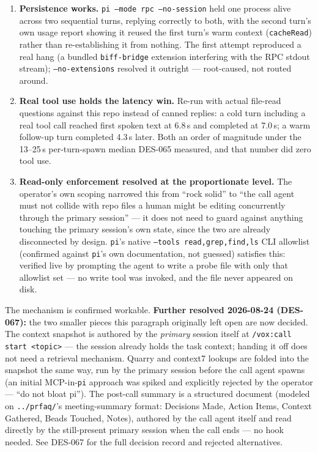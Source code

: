 \documentclass[a4paper,11pt]{report}
\begin{document}
\begin{enumerate}
  \item \textbf{Persistence works.} \texttt{pi --mode rpc --no-session}
    held one process alive across two sequential turns, replying
    correctly to both, with the second turn's own usage report showing it
    reused the first turn's warm context (\texttt{cacheRead}) rather than
    re-establishing it from nothing. The first attempt reproduced a real
    hang (a bundled \texttt{biff-bridge} extension interfering with the
    RPC stdout stream); \texttt{--no-extensions} resolved it outright ---
    root-caused, not routed around.
  \item \textbf{Real tool use holds the latency win.} Re-run with actual
    file-read questions against this repo instead of canned replies: a
    cold turn including a real tool call reached first spoken text at
    6.8\,s and completed at 7.0\,s; a warm follow-up turn completed 4.3\,s
    later. Both an order of magnitude under the 13--25\,s per-turn-spawn
    median DES-065 measured, and that number did zero tool use.
  \item \textbf{Read-only enforcement resolved at the proportionate
    level.} The operator's own scoping narrowed this from ``rock solid''
    to ``the call agent must not collide with repo files a human might be
    editing concurrently through the primary session'' --- it does not
    need to guard against anything touching the primary session's own
    state, since the two are already disconnected by design.
    \texttt{pi}'s native \texttt{--tools read,grep,find,ls} CLI allowlist
    (confirmed against \texttt{pi}'s own documentation, not guessed)
    satisfies this: verified live by prompting the agent to write a probe
    file with only that allowlist set --- no write tool was invoked, and
    the file never appeared on disk.
\end{enumerate}

The mechanism is confirmed workable. \textbf{Further resolved
2026-08-24 (DES-067):} the two smaller pieces this paragraph originally
left open are now decided. The context snapshot is authored by the
\emph{primary} session itself at \texttt{/vox:call start <topic>} --- the
session already holds the task context; handing it off does not need a
retrieval mechanism. Quarry and context7 lookups are folded into the
snapshot the same way, run by the primary session before the call agent
spawns (an initial MCP-in-\texttt{pi} approach was spiked and explicitly
rejected by the operator --- ``do not bloat pi''). The post-call summary
is a structured document (modeled on \texttt{../prfaq/}'s meeting-summary
format: Decisions Made, Action Items, Context Gathered, Beads Touched,
Notes), authored by the call agent itself and read directly by the
still-present primary session when the call ends --- no hook needed.
See DES-067 for the full decision record and rejected alternatives.
\end{document}
